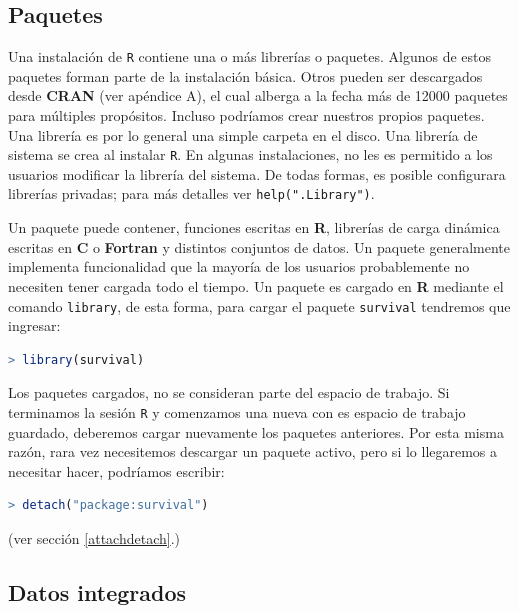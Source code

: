 \subsection{Paquetes}\label{paquetes}

Una instalación de \texttt{R} contiene una o más librerías o paquetes. Algunos
de estos paquetes forman parte de la instalación básica.  Otros pueden ser
descargados desde \textbf{CRAN} (ver apéndice A), el cual alberga a la fecha
más de 12000 paquetes para múltiples propósitos.  Incluso podríamos crear
nuestros propios paquetes. Una librería es por lo general una simple carpeta en
el disco. Una librería de sistema se crea al instalar \texttt{R}.  En algunas
instalaciones, no les es permitido a los usuarios modificar la librería del
sistema. De todas formas, es posible configurara librerías privadas; para más
detalles ver \texttt{help(".Library")}.

Un paquete puede contener, funciones escritas en \textbf{R}, librerías de carga
dinámica escritas en \textbf{C} o \textbf{Fortran} y distintos conjuntos de
datos.  Un paquete generalmente implementa funcionalidad que la mayoría de los
usuarios probablemente no necesiten tener cargada todo el tiempo. Un paquete es
cargado en \textbf{R} mediante el comando \texttt{library}, de esta forma, para
cargar el paquete \texttt{survival} tendremos que ingresar:

\begin{lstlisting}[language=R]
> library(survival)
\end{lstlisting}

Los paquetes cargados, no se consideran parte del espacio de trabajo. Si
terminamos la sesión \texttt{R} y comenzamos una nueva con es espacio de
trabajo guardado, deberemos cargar nuevamente los paquetes anteriores.  Por
esta misma razón, rara vez necesitemos descargar un paquete activo, pero si lo
llegaremos a necesitar hacer, podríamos escribir:

\begin{lstlisting}[language=R]
> detach("package:survival")
\end{lstlisting}

(ver sección \ref{attachdetach}.)

\subsection{Datos integrados}

